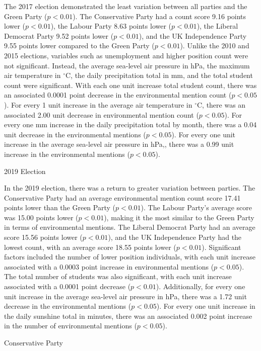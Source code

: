 \documentclass[12pt,letterpaper]{article}
\begin{document}
The 2017 election demonstrated the least variation between all parties and the Green Party ($p<0.01$). The Conservative Party had a count score 9.16 points lower ($p<0.01$), the Labour Party 8.63 points lower ($p<0.01$), the Liberal Democrat Party 9.52 points lower ($p<0.01$), and the UK Independence Party 9.55 points lower compared to the Green Party ($p<0.01$). Unlike the 2010 and 2015 elections, variables such as unemployment and higher position count were not significant. Instead, the average sea-level air pressure in hPa, the maximum air temperature in $^\circ$C, the daily precipitation total in mm, and the total student count were significant. With each one unit increase total student count, there was an associated 0.0001 point decrease in the environmental mention count ($p<0.05$). For every 1 unit increase in the average air temperature in $^\circ$C, there was an associated 2.00 unit decrease in environmental mention count ($p<0.05$). For every one mm increase in the daily precipitation total by month, there was a 0.04 unit decrease in the environmental mentions ($p<0.05$). For every one unit increase in the average sea-level air pressure in hPa,, there was a 0.99 unit increase in the environmental mentions ($p<0.05$). 

2019 Election

In the 2019 election, there was a return to greater variation between parties. The Conservative Party had an average environmental mention count score 17.41 points lower than the Green Party ($p<0.01$). The Labour Party’s average score was 15.00 points lower ($p<0.01$), making it the most similar to the Green Party in terms of environmental mentions. The Liberal Democrat Party had an average score 15.56 points lower ($p<0.01$), and the UK Independence Party had the lowest count, with an average score 18.55 points lower ($p<0.01$). Significant factors included the number of lower position individuals, with each unit increase associated with a 0.0003 point increase in environmental mentions ($p<0.05$). The total number of students was also significant, with each unit increase associated with a 0.0001 point decrease ($p<0.01$). Additionally, for every one unit increase in the average sea-level air pressure in hPa, there was a 1.72 unit decrease in the environmental mentions ($p<0.05$). For every one unit increase in the daily sunshine total in minutes, there was an associated 0.002 point increase in the number of environmental mentions ($p<0.05$).

Conservative Party
\end{document}
